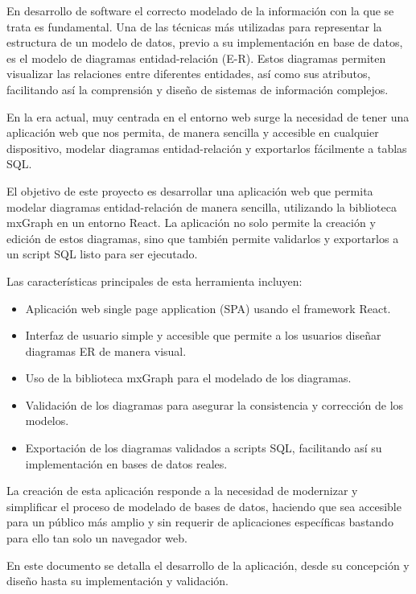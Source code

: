 
En desarrollo de software el correcto modelado de la información con la que se trata es fundamental. Una de las técnicas más utilizadas para representar la estructura de un modelo de datos, previo a su implementación en base de datos, es el modelo de diagramas entidad-relación (E-R). Estos diagramas permiten visualizar las relaciones entre diferentes entidades, así como sus atributos, facilitando así la comprensión y diseño de sistemas de información complejos.

En la era actual, muy centrada en el entorno web surge la necesidad de tener una aplicación web que nos permita, de manera sencilla y accesible en cualquier dispositivo, modelar diagramas entidad-relación y exportarlos fácilmente a tablas SQL.

El objetivo de este proyecto es desarrollar una aplicación web que permita modelar diagramas entidad-relación de manera sencilla, utilizando la biblioteca mxGraph en un entorno React. La aplicación no solo permite la creación y edición de estos diagramas, sino que también permite validarlos y exportarlos a un script SQL listo para ser ejecutado.

Las características principales de esta herramienta incluyen:
\begin{itemize}
\tightlist
    \item Aplicación web single page application (SPA) usando el framework React.
    \item Interfaz de usuario simple y accesible que permite a los usuarios diseñar diagramas ER de manera visual.
    \item Uso de la biblioteca mxGraph para el modelado de los diagramas.
    \item Validación de los diagramas para asegurar la consistencia y corrección de los modelos.
    \item Exportación de los diagramas validados a scripts SQL, facilitando así su implementación en bases de datos reales.
\end{itemize}

La creación de esta aplicación responde a la necesidad de modernizar y simplificar el proceso de modelado de bases de datos, haciendo que sea accesible para un público más amplio y sin requerir de aplicaciones específicas bastando para ello tan solo un navegador web.

En este documento se detalla el desarrollo de la aplicación, desde su concepción y diseño hasta su implementación y validación.


